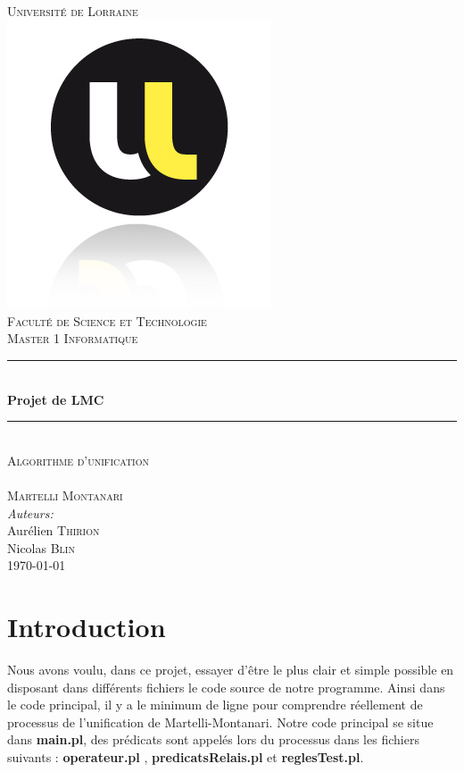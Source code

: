 \documentclass[10pt,a4paper]{report}
\newcommand{\HRule}{\rule{\linewidth}{1mm}}
\begin{document}
\begin{titlepage}
    \begin{center}
      ~\\[4cm]
      \textsc{\huge Université de Lorraine}\\[1.0cm]
      \includegraphics{univr.jpg}\\[0.5cm]
      \textsc{\Large Faculté de Science et Technologie}\\[0.5cm]
      \textsc{\Large Master 1 Informatique}\\[0.5cm]
      \HRule \\[0.4cm]
      { \huge \bfseries Projet de LMC \\[0.4cm] }
      \HRule \\[1cm]
     \textsc{\LARGE Algorithme d'unification \\ ~ \\ Martelli Montanari }\\[4cm]
	\emph{Auteurs:}\\
	Aurélien \textsc{Thirion} \\
	Nicolas \textsc{Blin}\\
      \vfill
      {\large \today}
    \end{center}
  \end{titlepage}








\chapter*{Introduction}
Nous avons voulu, dans ce projet, essayer d'être le plus clair et simple possible en
disposant dans différents fichiers le code source de notre programme. Ainsi dans le code
principal, il y a le minimum de ligne pour comprendre réellement de processus de
l'unification de Martelli-Montanari. Notre code principal se situe dans \textbf{main.pl}, des
prédicats sont appelés lors du processus dans les fichiers suivants : \textbf{operateur.pl} ,
\textbf{predicatsRelais.pl} et \textbf{reglesTest.pl}.\\[1cm]
\end{document}
